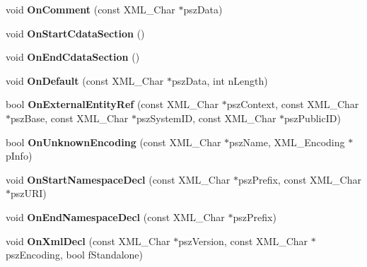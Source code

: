 \begin{DoxyCompactItemize}
\item 
\hypertarget{class_c_expat_impl_a3e107b5f2b8f3e0784e4bc3b21d9a954}{void {\bfseries On\+Comment} (const X\+M\+L\+\_\+\+Char $\ast$psz\+Data)}\label{class_c_expat_impl_a3e107b5f2b8f3e0784e4bc3b21d9a954}

\item 
\hypertarget{class_c_expat_impl_a5a7082a8c80f14cfed55edc084e1a448}{void {\bfseries On\+Start\+Cdata\+Section} ()}\label{class_c_expat_impl_a5a7082a8c80f14cfed55edc084e1a448}

\item 
\hypertarget{class_c_expat_impl_af5fffe076811b52ef4de3e2399504c4c}{void {\bfseries On\+End\+Cdata\+Section} ()}\label{class_c_expat_impl_af5fffe076811b52ef4de3e2399504c4c}

\item 
\hypertarget{class_c_expat_impl_a18a56a0963c1964ef785592a6c9cc7dc}{void {\bfseries On\+Default} (const X\+M\+L\+\_\+\+Char $\ast$psz\+Data, int n\+Length)}\label{class_c_expat_impl_a18a56a0963c1964ef785592a6c9cc7dc}

\item 
\hypertarget{class_c_expat_impl_a413ff03445b1213314747265a1085d0a}{bool {\bfseries On\+External\+Entity\+Ref} (const X\+M\+L\+\_\+\+Char $\ast$psz\+Context, const X\+M\+L\+\_\+\+Char $\ast$psz\+Base, const X\+M\+L\+\_\+\+Char $\ast$psz\+System\+I\+D, const X\+M\+L\+\_\+\+Char $\ast$psz\+Public\+I\+D)}\label{class_c_expat_impl_a413ff03445b1213314747265a1085d0a}

\item 
\hypertarget{class_c_expat_impl_a17863cd62866c6895319a99c46ec56e1}{bool {\bfseries On\+Unknown\+Encoding} (const X\+M\+L\+\_\+\+Char $\ast$psz\+Name, X\+M\+L\+\_\+\+Encoding $\ast$p\+Info)}\label{class_c_expat_impl_a17863cd62866c6895319a99c46ec56e1}

\item 
\hypertarget{class_c_expat_impl_a6e40ab1481ae7a0b498d390050467886}{void {\bfseries On\+Start\+Namespace\+Decl} (const X\+M\+L\+\_\+\+Char $\ast$psz\+Prefix, const X\+M\+L\+\_\+\+Char $\ast$psz\+U\+R\+I)}\label{class_c_expat_impl_a6e40ab1481ae7a0b498d390050467886}

\item 
\hypertarget{class_c_expat_impl_a4aa22e82d10534373a7cf90354e4d9f2}{void {\bfseries On\+End\+Namespace\+Decl} (const X\+M\+L\+\_\+\+Char $\ast$psz\+Prefix)}\label{class_c_expat_impl_a4aa22e82d10534373a7cf90354e4d9f2}

\item 
\hypertarget{class_c_expat_impl_a852c68ceb2b2527ff04a245eeac51dfa}{void {\bfseries On\+Xml\+Decl} (const X\+M\+L\+\_\+\+Char $\ast$psz\+Version, const X\+M\+L\+\_\+\+Char $\ast$psz\+Encoding, bool f\+Standalone)}\label{class_c_expat_impl_a852c68ceb2b2527ff04a245eeac51dfa}


\end{DoxyCompactItemize}
